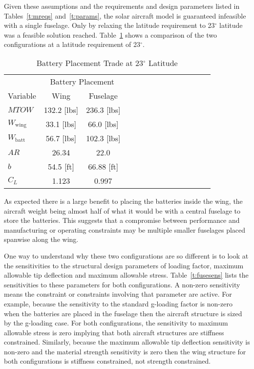\documentclass[]{aiaa-tc}%
\begin{document}
Given these assumptions and the requirements and design parameters listed in Tables~\ref{t:mreqs} and~\ref{t:params}, the solar aircraft model is guaranteed infeasible with a single fuselage. Only by relaxing the latitude requirement to 23$^{\circ}$ latitude was a feasible solution reached.  Table~\ref{t:fuse} shows a comparison of the two configurations at a latitude requirement of 23$^{\circ}$. 

\begin{longtable}{lccccccccccccc}
    \caption{Battery Placement Trade at 23$^{\circ}$ Latitude}\\
    \toprule
    \toprule
    \label{t:fuse}
                            & \multicolumn{2}{c}{Battery Placement} \\
    Variable                & Wing          &  Fuselage     \\ \hline
    $MTOW$                  & 132.2 [lbs]   & 236.3 [lbs]   \\
    $W_{\mathrm{wing}}$     & 33.1 [lbs]    & 66.0 [lbs]    \\
    $W_{\mathrm{batt}}$     & 56.7 [lbs]    & 102.3 [lbs]   \\
    $AR$                    & 26.34         & 22.0          \\
    $b$                     & 54.5 [ft]     &  66.88 [ft]   \\
    $C_L$                   & 1.123         &  0.997        \\
    \bottomrule
\end{longtable}

As expected there is a large benefit to placing the batteries inside the wing, the aircraft weight being almost half of what it would be with a central fuselage to store the batteries.  
This suggests that a compromise between performance and manufacturing or operating constraints may be multiple smaller fuselages placed spanwise along the wing.  

One way to understand why these two configurations are so different is to look at the sensitivities to the structural design parameters of loading factor, maximum allowable tip deflection and maximum allowable stress. 
Table~\ref{t:fusesens} lists the sensitivities to these parameters for both configurations. 
A non-zero sensitivity means the constraint or constraints involving that parameter are active.  
For example, because the sensitivity to the standard g-loading factor is non-zero when the batteries are placed in the fuselage then the aircraft structure is sized by the g-loading case.  
For both configurations, the sensitivity to maximum allowable stress is zero implying that both aircraft structures are stiffness constrained. 
Similarly, because the maximum allowable tip deflection sensitivity is non-zero and the material strength sensitivity is zero then the wing structure for both configurations is stiffness constrained, not strength constrained. 
\end{document}
